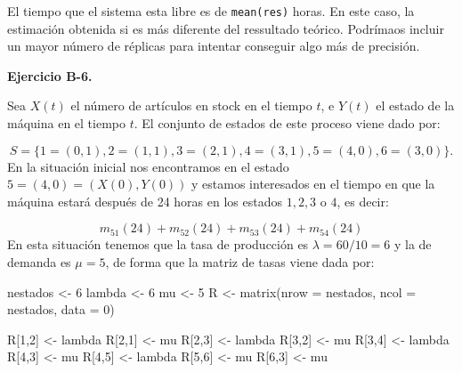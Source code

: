 \documentclass[
]{book}
\newenvironment{Shaded}{\begin{snugshade}}{\end{snugshade}}
\newcommand{\AttributeTok}[1]{\textcolor[rgb]{0.77,0.63,0.00}{#1}}
\newcommand{\DecValTok}[1]{\textcolor[rgb]{0.00,0.00,0.81}{#1}}
\newcommand{\FunctionTok}[1]{\textcolor[rgb]{0.00,0.00,0.00}{#1}}
\newcommand{\NormalTok}[1]{#1}
\newcommand{\OtherTok}[1]{\textcolor[rgb]{0.56,0.35,0.01}{#1}}
\theoremstyle{definition}
\theoremstyle{definition}
\theoremstyle{definition}
\theoremstyle{definition}
\theoremstyle{remark}
\begin{document}
El tiempo que el sistema esta libre es de \texttt{mean(res)} horas. En este caso, la estimación obtenida si es más diferente del ressultado teórico. Podrímaos incluir un mayor número de réplicas para intentar conseguir algo más de precisión.

\textbf{Ejercicio B-6.}

Sea \(X(t)\) el número de artículos en stock en el tiempo \(t\), e \(Y(t)\) el estado de la máquina en el tiempo \(t\). El conjunto de estados de este proceso viene dado por:

\[S = \{1 = (0, 1), 2 = (1, 1), 3 = (2, 1), 4 = (3, 1), 5 = (4, 0), 6 = (3, 0)\}.\]
En la situación inicial nos encontramos en el estado \(5 = (4, 0) = (X(0), Y(0))\) y estamos interesados en el tiempo en que la máquina estará después de 24 horas en los estados \(1, 2, 3\) o \(4\), es decir:

\[m_{51}(24) + m_{52}(24) + m_{53}(24) + m_{54}(24)\]
En esta situación tenemos que la tasa de producción es \(\lambda = 60/10 = 6\) y la de demanda es \(\mu = 5\), de forma que la matriz de tasas viene dada por:

\begin{Shaded}
\begin{Highlighting}[]
\NormalTok{nestados }\OtherTok{\textless{}{-}} \DecValTok{6}
\NormalTok{lambda }\OtherTok{\textless{}{-}} \DecValTok{6}
\NormalTok{mu }\OtherTok{\textless{}{-}} \DecValTok{5}
\NormalTok{R }\OtherTok{\textless{}{-}} \FunctionTok{matrix}\NormalTok{(}\AttributeTok{nrow =}\NormalTok{ nestados, }\AttributeTok{ncol =}\NormalTok{ nestados, }\AttributeTok{data =} \DecValTok{0}\NormalTok{)}

\NormalTok{R[}\DecValTok{1}\NormalTok{,}\DecValTok{2}\NormalTok{] }\OtherTok{\textless{}{-}}\NormalTok{ lambda }
\NormalTok{R[}\DecValTok{2}\NormalTok{,}\DecValTok{1}\NormalTok{] }\OtherTok{\textless{}{-}}\NormalTok{ mu}
\NormalTok{R[}\DecValTok{2}\NormalTok{,}\DecValTok{3}\NormalTok{] }\OtherTok{\textless{}{-}}\NormalTok{ lambda }
\NormalTok{R[}\DecValTok{3}\NormalTok{,}\DecValTok{2}\NormalTok{] }\OtherTok{\textless{}{-}}\NormalTok{ mu}
\NormalTok{R[}\DecValTok{3}\NormalTok{,}\DecValTok{4}\NormalTok{] }\OtherTok{\textless{}{-}}\NormalTok{ lambda}
\NormalTok{R[}\DecValTok{4}\NormalTok{,}\DecValTok{3}\NormalTok{] }\OtherTok{\textless{}{-}}\NormalTok{ mu}
\NormalTok{R[}\DecValTok{4}\NormalTok{,}\DecValTok{5}\NormalTok{] }\OtherTok{\textless{}{-}}\NormalTok{ lambda}
\NormalTok{R[}\DecValTok{5}\NormalTok{,}\DecValTok{6}\NormalTok{] }\OtherTok{\textless{}{-}}\NormalTok{ mu}
\NormalTok{R[}\DecValTok{6}\NormalTok{,}\DecValTok{3}\NormalTok{] }\OtherTok{\textless{}{-}}\NormalTok{ mu}
\end{Highlighting}
\end{Shaded}
\end{document}

